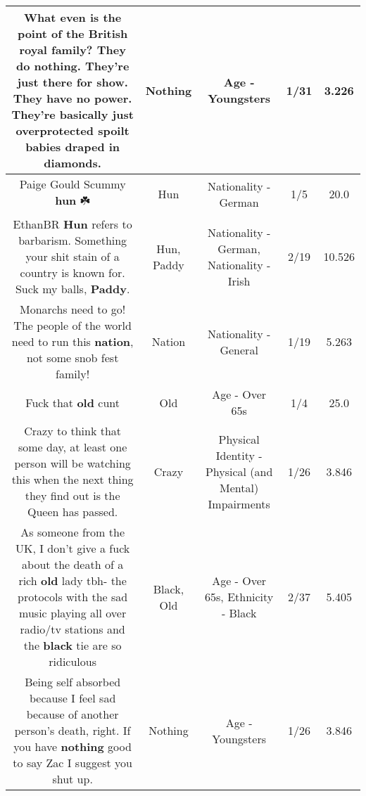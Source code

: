 \documentclass[11pt]{article}
\newlength\mylength
\begin{document}
\begin{center}
\begin{longtable}{|C{.65\mylength}|C{.30\mylength}|C{.12\mylength}|C{.12\mylength}|C{.12\mylength}|}
  \small What even is the point of the British royal family? They do \textbf{nothing}. They're just there for show. They have no power. They're basically just overprotected spoilt babies draped in diamonds.\normalsize   & Nothing & Age - Youngsters & 1/31 & 3.226 \\  \hline
  \small Paige Gould Scummy \textbf{hun} ☘️\normalsize   & Hun & Nationality - German & 1/5 & 20.0 \\  \hline
  \small EthanBR \textbf{Hun} refers to barbarism. Something your shit stain of a country is known for. Suck my balls, \textbf{Paddy}.\normalsize   & Hun, Paddy & Nationality - German, Nationality - Irish & 2/19 & 10.526 \\  \hline
  \small Monarchs need to go! The people of the world need to run this \textbf{nation}, not some snob fest family!\normalsize   & Nation & Nationality - General & 1/19 & 5.263 \\  \hline
  \small Fuck that \textbf{old} cunt\normalsize   & Old & Age - Over 65s & 1/4 & 25.0 \\  \hline
  \small Crazy to think that some day, at least one person will be watching this when the next thing they find out is the Queen has passed.\normalsize   & Crazy & Physical Identity - Physical (and Mental) Impairments & 1/26 & 3.846 \\  \hline
  \small As someone from the UK, I don't give a fuck about the death of a rich \textbf{old} lady tbh- the protocols with the sad music playing all over radio/tv stations and the \textbf{black} tie are so ridiculous\normalsize   & Black, Old & Age - Over 65s, Ethnicity - Black & 2/37 & 5.405 \\  \hline
  \small Being self absorbed because I feel sad because of another person's death, right. If you have \textbf{nothing} good to say Zac I suggest you shut up.\normalsize   & Nothing & Age - Youngsters & 1/26 & 3.846 \\  \hline

\end{longtable}
\end{center}
\end{document}
